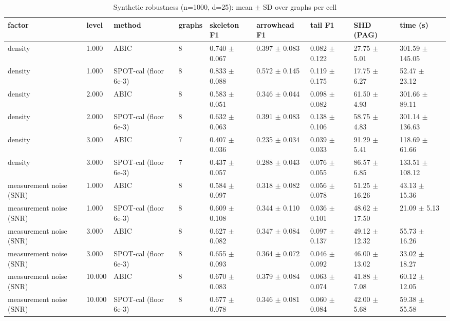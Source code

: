 \begin{table}[t]
\centering\footnotesize
\caption{Synthetic robustness (n=1000, d=25): mean $\pm$ SD over graphs per cell}\label{tab:T1b_synthetic_robustness}
\begin{tabular}{@{}lllllllll@{}}
\toprule
factor & level & method & graphs & skeleton F1 & arrowhead F1 & tail F1 & SHD (PAG) & time (s)\\
\midrule
density & 1.000 & ABIC & 8 & 0.740 $\pm$ 0.067 & 0.397 $\pm$ 0.083 & 0.082 $\pm$ 0.122 & 27.75 $\pm$ 5.01 & 301.59 $\pm$ 145.05\\
density & 1.000 & SPOT-cal (floor 6e-3) & 8 & 0.833 $\pm$ 0.088 & 0.572 $\pm$ 0.145 & 0.119 $\pm$ 0.175 & 17.75 $\pm$ 6.27 & 52.47 $\pm$ 23.12\\
density & 2.000 & ABIC & 8 & 0.583 $\pm$ 0.051 & 0.346 $\pm$ 0.044 & 0.098 $\pm$ 0.082 & 61.50 $\pm$ 4.93 & 301.66 $\pm$ 89.11\\
density & 2.000 & SPOT-cal (floor 6e-3) & 8 & 0.632 $\pm$ 0.063 & 0.391 $\pm$ 0.083 & 0.138 $\pm$ 0.106 & 58.75 $\pm$ 4.83 & 301.14 $\pm$ 136.63\\
density & 3.000 & ABIC & 7 & 0.407 $\pm$ 0.036 & 0.235 $\pm$ 0.034 & 0.039 $\pm$ 0.033 & 91.29 $\pm$ 5.41 & 118.69 $\pm$ 61.66\\
density & 3.000 & SPOT-cal (floor 6e-3) & 7 & 0.437 $\pm$ 0.057 & 0.288 $\pm$ 0.043 & 0.076 $\pm$ 0.055 & 86.57 $\pm$ 6.85 & 133.51 $\pm$ 108.12\\
measurement noise (SNR) & 1.000 & ABIC & 8 & 0.584 $\pm$ 0.097 & 0.318 $\pm$ 0.082 & 0.056 $\pm$ 0.078 & 51.25 $\pm$ 16.26 & 43.13 $\pm$ 15.36\\
measurement noise (SNR) & 1.000 & SPOT-cal (floor 6e-3) & 8 & 0.609 $\pm$ 0.108 & 0.344 $\pm$ 0.110 & 0.036 $\pm$ 0.101 & 48.62 $\pm$ 17.50 & 21.09 $\pm$ 5.13\\
measurement noise (SNR) & 3.000 & ABIC & 8 & 0.627 $\pm$ 0.082 & 0.347 $\pm$ 0.084 & 0.097 $\pm$ 0.137 & 49.12 $\pm$ 12.32 & 55.73 $\pm$ 16.26\\
measurement noise (SNR) & 3.000 & SPOT-cal (floor 6e-3) & 8 & 0.655 $\pm$ 0.093 & 0.364 $\pm$ 0.072 & 0.046 $\pm$ 0.092 & 46.00 $\pm$ 13.02 & 33.02 $\pm$ 18.27\\
measurement noise (SNR) & 10.000 & ABIC & 8 & 0.670 $\pm$ 0.083 & 0.379 $\pm$ 0.084 & 0.063 $\pm$ 0.074 & 41.88 $\pm$ 7.08 & 60.12 $\pm$ 12.05\\
measurement noise (SNR) & 10.000 & SPOT-cal (floor 6e-3) & 8 & 0.677 $\pm$ 0.078 & 0.346 $\pm$ 0.081 & 0.060 $\pm$ 0.084 & 42.00 $\pm$ 5.68 & 59.38 $\pm$ 55.58\\

\end{tabular}
\end{table}
